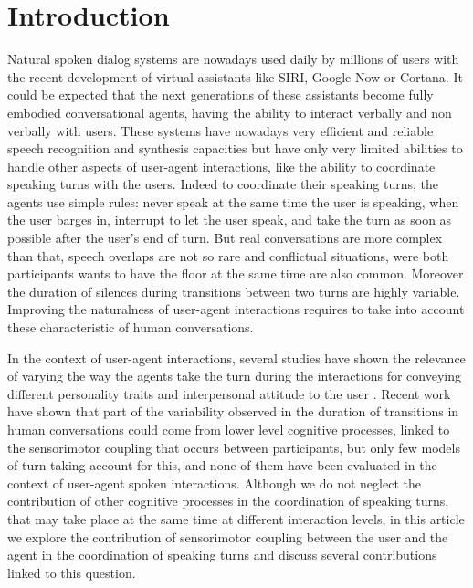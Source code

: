 \section{Introduction}

Natural spoken dialog systems are nowadays used daily by millions of users with the recent development of virtual assistants like SIRI, Google Now or Cortana.
It could be expected that the next generations of these assistants become fully embodied conversational agents,  having the ability to interact verbally and non verbally with users. 
These systems have nowadays very efficient and reliable speech recognition and synthesis capacities but have only very limited abilities to handle other aspects of user-agent interactions, like the ability to coordinate speaking turns with the users. 
Indeed to coordinate their speaking turns, the agents use simple rules: never speak at the same time the user is speaking, when the user barges in, interrupt to let the user speak, and take the turn as soon as possible after the user's end of turn. But real conversations are more complex than that, speech overlaps are not so rare and conflictual situations, were both participants wants to have the floor at the same time are also common. Moreover the duration of silences during transitions between two turns are highly variable. 
Improving the naturalness of user-agent interactions requires to take into account these characteristic of human conversations.

In the context of user-agent interactions, several studies have shown the relevance of varying the way the agents take the turn during the interactions for conveying different personality traits and interpersonal attitude to the user \citep{ter_maat_how_2010,cafaro_effects_2016}. 
Recent work have shown that part of the variability observed in the duration of transitions in human conversations could come from lower level cognitive processes, linked to the sensorimotor coupling that occurs between participants, but only few models of turn-taking account for this, and none of them have been evaluated in the context of user-agent spoken interactions. 
Although we do not neglect the contribution of other cognitive processes in the coordination of speaking turns, that may take place at the same time at different interaction levels, 
in this article we explore the contribution of sensorimotor coupling between the user and the agent in the coordination of speaking turns and discuss several contributions linked to this question. 

